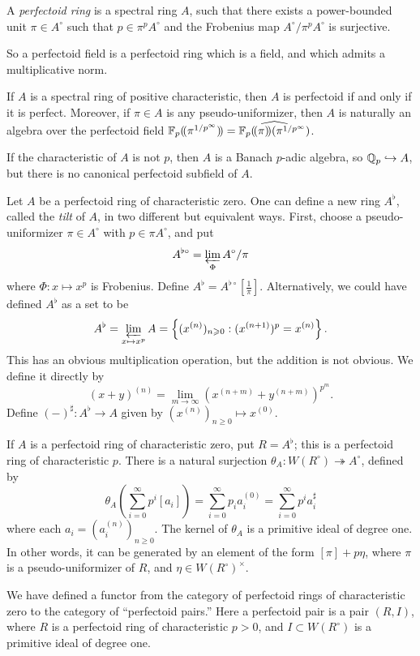 \documentclass{article}
\begin{document}
\begin{definition}
A \emph{perfectoid ring} is a spectral ring $A$, such that there exists a 
power-bounded unit $\pi\in A^\circ$ such that $p\in \pi^p A^\circ$ and the 
Frobenius map $A^\circ/\pi^p A^\circ$ is surjective. 
\end{definition}

So a perfectoid field is a perfectoid ring which is a field, and which admits a multiplicative norm. 

If $A$ is a spectral ring of positive characteristic, then $A$ is perfectoid 
if and only if it is perfect. Moreover, if $\pi\in A$ is any 
pseudo-uniformizer, then $A$ is naturally an algebra over the perfectoid field 
$\mathbb{F}_p(\!( {\pi^{1/p^\infty}} )\!) = \widehat{\mathbb{F}_p(\!( {\pi} )\!) (\pi^{1/p^\infty})}$. 

If the characteristic of $A$ is not $p$, then $A$ is a Banach $p$-adic algebra, 
so $\mathbb{Q}_p\hookrightarrow A$, but there is no canonical perfectoid subfield of 
$A$. 

Let $A$ be a perfectoid ring of characteristic zero. One can define a new ring 
$A^\flat$, called the \emph{tilt} of $A$, in two different but equivalent ways. 
First, choose a pseudo-uniformizer $\pi\in A^\circ$ with $p\in \pi A^\circ$, 
and put 
\[
  A^{\flat\circ} = \varprojlim_\Phi A^\circ/\pi
\]
where $\Phi:x\mapsto x^p$ is Frobenius. Define 
$A^\flat=A^{\flat\circ}[\frac 1 \pi]$. Alternatively, we could have defined 
$A^\flat$ as a set to be  
\[
  A^\flat = \varprojlim_{x\mapsto x^p} A = \left\{(x^{(n)})_{n\geqslant 0}:(x^{(n+1)})^p = x^{(n)}\right\} .
\]
This has an obvious multiplication operation, but the addition is not obvious. 
We define it directly by 
\[
  (x+y)^{(n)} = \lim_{m\to \infty} (x^{(n+m)} + y^{(n+m)})^{p^m} .
\]
Define $(-)^\sharp:A^\flat \to A$ given by 
$(x^{(n)})_{n\geqslant 0} \mapsto x^{(0)}$. 

If $A$ is a perfectoid ring of characteristic zero, put $R=A^\flat$; this is 
a perfectoid ring of characteristic $p$. There is a natural surjection 
$\theta_A:W(R^\circ) \twoheadrightarrow A^\circ$, defined by 
\[
  \theta_A\left(\sum_{i=0}^\infty p^i [a_i]\right) = \sum_{i=0}^\infty p_i a_i^{(0)} = \sum_{i=0}^\infty p^i a_i^\sharp
\]
where each $a_i=(a_i^{(n)})_{n\geqslant 0}$. The kernel of 
$\theta_A$ is a primitive ideal of degree one. In other words, it can be 
generated by an element of the form $[\pi]+p\eta$, where $\pi$ is a 
pseudo-uniformizer of $R$, and $\eta\in W(R^\circ)^\times$. 

We have defined a functor from the category of perfectoid rings of 
characteristic zero to the category of ``perfectoid pairs.'' Here a perfectoid 
pair is a pair $(R,I)$, where $R$ is a perfectoid ring of characteristic $p>0$, 
and $I\subset W(R^\circ)$ is a primitive ideal of degree one. 
\end{document}
